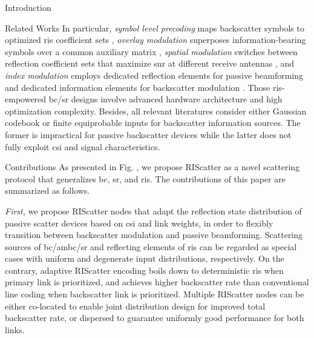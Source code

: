 \documentclass[journal]{IEEEtran}
\begin{document}
\begin{section}{Introduction}
\begin{subsection}{Related Works}
		In particular, \emph{symbol level precoding} maps backscatter symbols to optimized \gls{ris} coefficient sets \cite{Liu2019d,Bereyhi2020}, \emph{overlay modulation} superposes information-bearing symbols over a common auxiliary matrix \cite{Xu2020b,Zhang2021d,Hu2021b,Hua2022}, \emph{spatial modulation} switches between reflection coefficient sets that maximize \gls{snr} at different receive antennas \cite{Basar2020,Ma2020a,Yuan2021}, and \emph{index modulation} employs dedicated reflection elements for passive beamforming and dedicated information elements for backscatter modulation \cite{Hu2021a}.
		Those \gls{ris}-empowered \gls{bc}/\gls{sr} designs involve advanced hardware architecture and high optimization complexity.
		Besides, all relevant literatures consider either Gaussian codebook \cite{Guo2019b,Ding2020,Long2020a,Zhou2019a,Wu2021a,Xu2021a,Yang2021a,Hu2021b} or finite equiprobable inputs \cite{Yang2018,Liang2020,Han2021,Zhang2022,Liu2019d,Bereyhi2020,Xu2020b,Zhang2021d,Hua2022,Basar2020,Ma2020a,Yuan2021,Hu2021a} for backscatter information sources.
		The former is impractical for passive backscatter devices while the latter does not fully exploit \gls{csi} and signal characteristics.
	\end{subsection}

	\begin{subsection}{Contributions}
		As presented in Fig. , we propose RIScatter as a novel scattering protocol that generalizes \gls{bc}, \gls{sr}, and \gls{ris}.
		The contributions of this paper are summarized as follows.

		\emph{First,} we propose RIScatter nodes that adapt the reflection state distribution of passive scatter devices based on \gls{csi} and link weights, in order to flexibly transition between backscatter modulation and passive beamforming.
		Scattering sources of \gls{bc}/\gls{ambc}/\gls{sr} and reflecting elements of \gls{ris} can be regarded as special cases with uniform and degenerate input distributions, respectively.
		On the contrary, adaptive RIScatter encoding boils down to deterministic \gls{ris} when primary link is prioritized, and achieves higher backscatter rate than conventional line coding when backscatter link is prioritized.
		Multiple RIScatter nodes can be either co-located to enable joint distribution design for improved total backscatter rate, or dispersed to guarantee uniformly good performance for both links.


\end{subsection}
\end{section}
\end{document}
